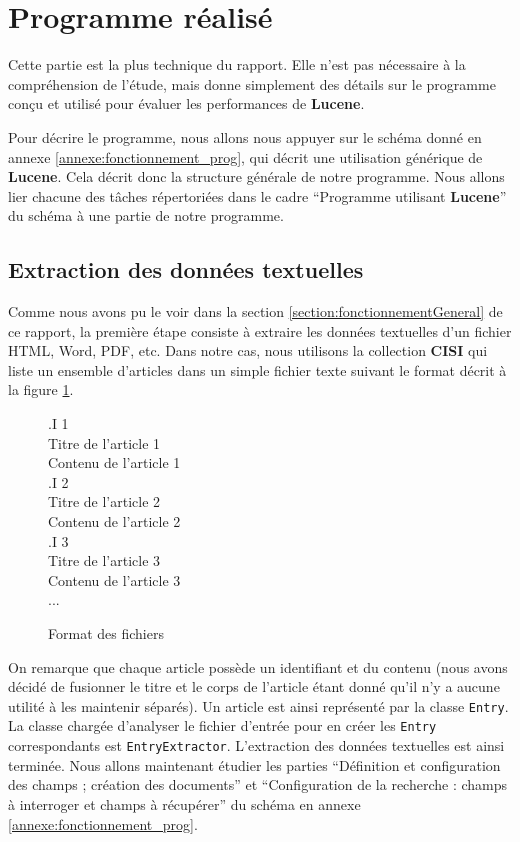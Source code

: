 \section{Programme réalisé}

Cette partie est la plus technique du rapport. Elle n’est pas nécessaire à la compréhension de l’étude, mais donne simplement des détails sur le programme conçu et utilisé pour évaluer les performances de \textbf{Lucene}.

Pour décrire le programme, nous allons nous appuyer sur le schéma donné en annexe \ref{annexe:fonctionnement_prog}, qui décrit une utilisation générique de \textbf{Lucene}. Cela décrit donc la structure générale de notre programme. Nous allons lier chacune des tâches répertoriées dans le cadre “Programme utilisant \textbf{Lucene}” du schéma à une partie de notre programme.

\subsection{Extraction des données textuelles}

Comme nous avons pu le voir dans la section \ref{section:fonctionnementGeneral} de ce rapport, la première étape consiste à extraire les données textuelles d’un fichier HTML, Word, PDF, etc. Dans notre cas, nous utilisons la collection \textbf{CISI} qui liste un ensemble d’articles dans un simple fichier texte suivant le format décrit à la figure \ref{formatTexte}.


 \begin{figure}[h]
 .I 1\\
 Titre de l’article 1\\
 Contenu de l’article 1\\
 .I 2\\
 Titre de l’article 2\\
 Contenu de l’article 2\\
 .I 3\\
 Titre de l’article 3\\
 Contenu de l’article 3\\
 ...
            \caption{Format des fichiers}
            \label{formatTexte}
 \end{figure}

On remarque que chaque article possède un identifiant et du contenu (nous avons décidé de fusionner le titre et le corps de l’article étant donné qu’il n’y a aucune utilité à les maintenir séparés). Un article est ainsi représenté par la classe \texttt{Entry}. La classe chargée d’analyser le fichier d’entrée pour en créer les \texttt{Entry} correspondants est \texttt{EntryExtractor}.
L’extraction des données textuelles est ainsi terminée. Nous allons maintenant étudier les parties “Définition et configuration des champs ; création des documents” et “Configuration de la recherche : champs à interroger et champs à récupérer” du schéma en annexe \ref{annexe:fonctionnement_prog}.

